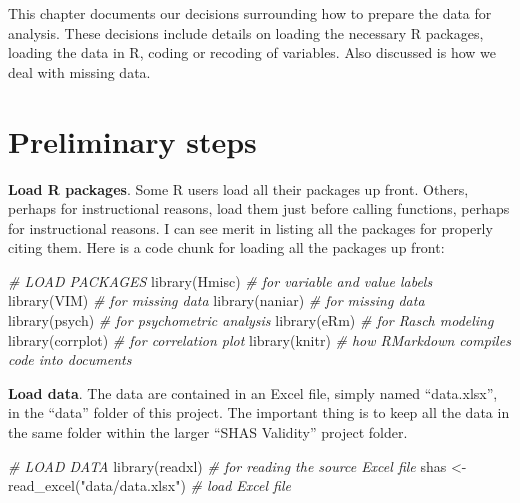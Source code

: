 \documentclass[
]{report}
\newenvironment{Shaded}{\begin{snugshade}}{\end{snugshade}}
\newcommand{\CommentTok}[1]{\textcolor[rgb]{0.56,0.35,0.01}{\textit{#1}}}
\newcommand{\FunctionTok}[1]{\textcolor[rgb]{0.00,0.00,0.00}{#1}}
\newcommand{\NormalTok}[1]{#1}
\newcommand{\OtherTok}[1]{\textcolor[rgb]{0.56,0.35,0.01}{#1}}
\newcommand{\StringTok}[1]{\textcolor[rgb]{0.31,0.60,0.02}{#1}}
\begin{document}
This chapter documents our decisions surrounding how to prepare the data for analysis. These decisions include details on loading the necessary R packages, loading the data in R, coding or recoding of variables. Also discussed is how we deal with missing data.

\hypertarget{preliminary-steps}{%
\section{Preliminary steps}\label{preliminary-steps}}

\textbf{Load R packages}. Some R users load all their packages up front. Others, perhaps for instructional reasons, load them just before calling functions, perhaps for instructional reasons. I can see merit in listing all the packages for properly citing them. Here is a code chunk for loading all the packages up front:

\begin{Shaded}
\begin{Highlighting}[]
\CommentTok{\# LOAD PACKAGES}
\FunctionTok{library}\NormalTok{(Hmisc)  }\CommentTok{\# for variable and value labels}
\FunctionTok{library}\NormalTok{(VIM)  }\CommentTok{\# for missing data}
\FunctionTok{library}\NormalTok{(naniar)  }\CommentTok{\# for missing data}
\FunctionTok{library}\NormalTok{(psych)  }\CommentTok{\# for psychometric analysis}
\FunctionTok{library}\NormalTok{(eRm)  }\CommentTok{\# for Rasch modeling}
\FunctionTok{library}\NormalTok{(corrplot)  }\CommentTok{\# for correlation plot}
\FunctionTok{library}\NormalTok{(knitr)  }\CommentTok{\# how RMarkdown compiles code into documents}
\end{Highlighting}
\end{Shaded}

\textbf{Load data}. The data are contained in an Excel file, simply named ``data.xlsx'', in the ``data'' folder of this project. The important thing is to keep all the data in the same folder within the larger ``SHAS Validity'' project folder.

\begin{Shaded}
\begin{Highlighting}[]
\CommentTok{\# LOAD DATA}
\FunctionTok{library}\NormalTok{(readxl)  }\CommentTok{\# for reading the source Excel file}
\NormalTok{shas }\OtherTok{\textless{}{-}} \FunctionTok{read\_excel}\NormalTok{(}\StringTok{"data/data.xlsx"}\NormalTok{)  }\CommentTok{\# load Excel file}
\end{Highlighting}
\end{Shaded}
\end{document}
